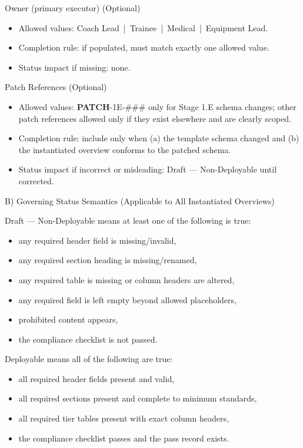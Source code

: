 \documentclass[10pt]{article}
\begin{document}
Owner (primary executor) (Optional)

\begin{itemize}
\item Allowed values: Coach Lead \,|\, Trainee \,|\, Medical \,|\, Equipment Lead.
\item Completion rule: if populated, must match exactly one allowed value.
\item Status impact if missing: none.
\end{itemize}

Patch References (Optional)

\begin{itemize}
\item Allowed values: \textbf{PATCH}-1E-\#\#\# only for Stage 1.E schema changes; other patch references allowed only if they exist elsewhere and are clearly scoped.
\item Completion rule: include only when (a) the template schema changed and (b) the instantiated overview conforms to the patched schema.
\item Status impact if incorrect or misleading: Draft — Non-Deployable until corrected.
\end{itemize}

B) Governing Status Semantics (Applicable to All Instantiated Overviews)

Draft — Non-Deployable means at least one of the following is true:

\begin{itemize}
\item any required header field is missing/invalid,
\item any required section heading is missing/renamed,
\item any required table is missing or column headers are altered,
\item any required field is left empty beyond allowed placeholders,
\item prohibited content appears,
\item the compliance checklist is not passed.
\end{itemize}

Deployable means all of the following are true:

\begin{itemize}
\item all required header fields present and valid,
\item all required sections present and complete to minimum standards,
\item all required tier tables present with exact column headers,
\item the compliance checklist passes and the pass record exists.
\end{itemize}
\end{document}
